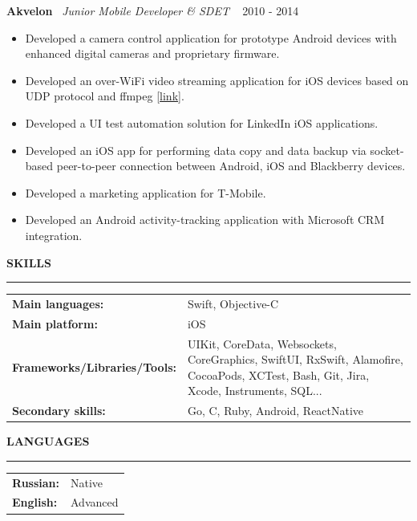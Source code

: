﻿\documentclass{article}
\newcommand{\cvsection}[1]{
  \vspace{2.6ex}
  \noindent\textbf{\large{\uppercase{#1}}}
  \vspace{1ex}
  \hrule
  \vspace{1.5ex}
}
\newcommand{\cvparagraph}[3]{
  \noindent\indent
  \textbf{#1}
  \
  \textit{#2}
  \
  \hfill{}
  {#3}\vspace{1ex}}
\newcommand{\cvtable}[1]{
  {\renewcommand{\arraystretch}{1.2}
    \begin{tabular}{p{\dimexpr.4\textwidth-1\parindent}p{\dimexpr.6\textwidth}}
      #1
    \end{tabular}}
}
\newcommand{\cvlist}[1]{
  \begin{itemize}[topsep=0ex,leftmargin=*,itemsep=0ex,parsep=1ex,labelwidth=\parindent]
    #1
  \end{itemize}
}
\begin{document}
\cvparagraph{Akvelon}{Junior Mobile Developer \& SDET}{2010 - 2014}
\cvlist{
  \item Developed a camera control application for prototype Android devices with enhanced digital cameras and proprietary firmware.
  \item Developed an over-WiFi video streaming application for iOS devices based on UDP protocol and ffmpeg [\href{http://neuronbeta.com/chirpglobal/chirpvision/app/}{link}].
  \item Developed a UI test automation solution for LinkedIn iOS applications.
  \item Developed an iOS app for performing data copy and data backup via socket-based peer-to-peer connection between Android, iOS and Blackberry devices.
  \item Developed a marketing application for T-Mobile.
  \item Developed an Android activity-tracking application with Microsoft CRM integration.
}

\cvsection{Skills}
\cvtable{
  \textbf{Main languages:} & Swift, Objective-C \\
  \textbf{Main platform:} & iOS \\
  \textbf{Frameworks/Libraries/Tools:} & UIKit, CoreData, Websockets, CoreGraphics, SwiftUI, RxSwift, Alamofire, CocoaPods, XCTest, Bash, Git, Jira, Xcode, Instruments, SQL... \\
	\textbf{Secondary skills:} & Go, C, Ruby, Android, ReactNative
}

\cvsection{Languages}
\cvtable{
  \textbf{Russian:} & Native \\
  \textbf{English:} & Advanced \\
}
\end{document}
